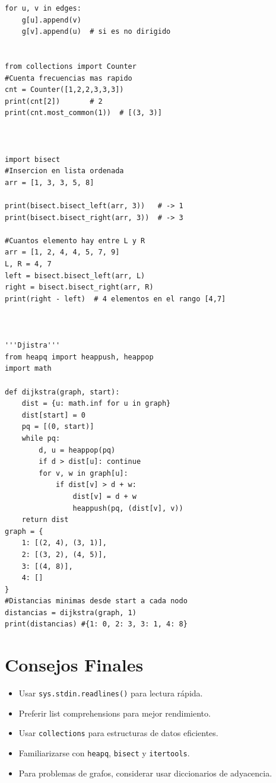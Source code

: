 \documentclass{article}
\begin{document}
\begin{lstlisting}[style=pythonstyle]
for u, v in edges:
    g[u].append(v)
    g[v].append(u)  # si es no dirigido


from collections import Counter
#Cuenta frecuencias mas rapido
cnt = Counter([1,2,2,3,3,3])
print(cnt[2])       # 2
print(cnt.most_common(1))  # [(3, 3)]



import bisect
#Insercion en lista ordenada
arr = [1, 3, 3, 5, 8]

print(bisect.bisect_left(arr, 3))   # -> 1
print(bisect.bisect_right(arr, 3))  # -> 3

#Cuantos elemento hay entre L y R
arr = [1, 2, 4, 4, 5, 7, 9]
L, R = 4, 7
left = bisect.bisect_left(arr, L)
right = bisect.bisect_right(arr, R)
print(right - left)  # 4 elementos en el rango [4,7]



'''Djistra'''
from heapq import heappush, heappop
import math

def dijkstra(graph, start):
    dist = {u: math.inf for u in graph}
    dist[start] = 0
    pq = [(0, start)]
    while pq:
        d, u = heappop(pq)
        if d > dist[u]: continue
        for v, w in graph[u]:
            if dist[v] > d + w:
                dist[v] = d + w
                heappush(pq, (dist[v], v))
    return dist
graph = {
    1: [(2, 4), (3, 1)],
    2: [(3, 2), (4, 5)],
    3: [(4, 8)],
    4: []
}
#Distancias minimas desde start a cada nodo
distancias = dijkstra(graph, 1)
print(distancias) #{1: 0, 2: 3, 3: 1, 4: 8}

\end{lstlisting}


\section{Consejos Finales}

\begin{itemize}
  \item Usar \texttt{sys.stdin.readlines()} para lectura rápida.
  \item Preferir list comprehensions para mejor rendimiento.
  \item Usar \texttt{collections} para estructuras de datos eficientes.
  \item Familiarizarse con \texttt{heapq}, \texttt{bisect} y \texttt{itertools}.
  \item Para problemas de grafos, considerar usar diccionarios de adyacencia.
\end{itemize}
\end{document}
